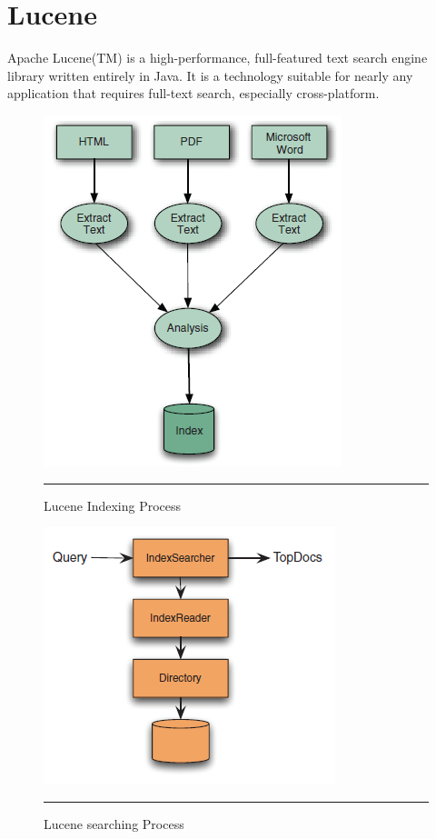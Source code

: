 \section{Lucene}
\label{luceneTool}
Apache Lucene(TM) is a high-performance, full-featured text search engine library written entirely in Java. It is a technology suitable for nearly any application that requires full-text search, especially cross-platform.
\begin{figure}[htbp]
	\begin{center}
		\includegraphics{./Figures/lucene.png}
		\rule{20em}{0.5pt}
	\end{center}
	\caption[Lucene Indexing Process]{Lucene Indexing Process}
	\label{fig:lucene1}
\end{figure}
\begin{figure}[htbp]
	\begin{center}
		\includegraphics{./Figures/lucene_search.png}
		\rule{20em}{0.5pt}
	\end{center}
	\caption[Lucene searching Process]{Lucene searching Process}
	\label{fig:lucene2}
\end{figure}
